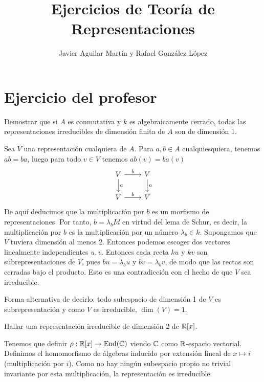 \documentclass[twoside]{article}
\begin{document}
\title{Ejercicios de Teoría de Representaciones}
\author{Javier Aguilar Martín y Rafael González López}
\maketitle

\section{Ejercicio del profesor}
\begin{ejercicio}{1}
Demostrar que si $A$ es conmutativa y $k$ es algebraicamente cerrado, todas las representaciones irreducibles de dimensión finita de $A$ son de dimensión 1. 
\end{ejercicio}
\begin{solucion}
Sea $V$ una representación cualquiera de $A$. Para $a,b\in A$ cualquiesquiera, tenemos $ab=ba$, luego para todo $v\in V$ tenemos $ab(v)=ba(v)$
\[
\begin{tikzcd}
V\arrow[r, "b"] \arrow[d, "a"] & V\arrow[d, "a"]\\
V\arrow[r, "b"] & V
\end{tikzcd}
\]
De aquí deducimos que la multiplicación por $b$ es un morfismo de representaciones. Por tanto, $b=\lambda_b Id$ en virtud del lema de Schur, es decir, la multiplicación por $b$ es la multiplicación por un número $\lambda_b\in k$. Supongamos que $V$ tuviera dimensión al menos 2. Entonces podemos escoger dos vectores linealmente independientes $u,v$. Entonces cada recta $ku$ y $kv$ son subrepresentaciones de $V$, pues $bu=\lambda_bu$ y $bv=\lambda_bv$, de modo que las rectas son cerradas bajo el producto. Esto es una contradicción con el hecho de que $V$ sea irreducible. 

Forma alternativa de decirlo: todo subespacio de dimensión 1 de $V$ es subrepresentación y como $V$ es irreducible, $\dim(V)=1$. 

\end{solucion}

\newpage

\begin{ejercicio}{2}
Hallar una representación irreducible de dimensión 2 de $\mathbb{R}[x]$. 
\end{ejercicio}
\begin{solucion}
Tenemos que definir $\rho:\mathbb{R}[x]\to \operatorname{End}(\mathbb{C})$ viendo $\mathbb{C}$ como $\mathbb{R}$-espacio vectorial. Definimos el homomorfismo de álgebras inducido por extensión lineal de $x\mapsto i$ (multiplicación por $i$). Como no hay ningún subespacio propio no trivial invariante por esta multiplicación, la representación es irreducible.  
\end{solucion}
\end{document}
